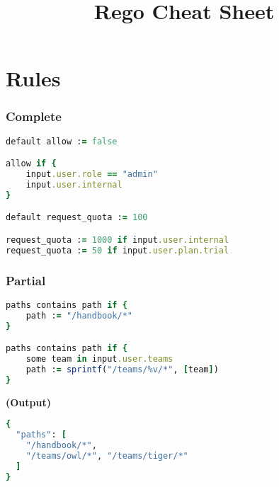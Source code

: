 \documentclass[twocolumn]{article}
\makeatletter
\renewcommand{\maketitle}{\bgroup\setlength{\parindent}{0pt}
\textbf{\LARGE{\@title}}
}
\makeatother
\begin{document}
\pagestyle{logo}
\title{Rego Cheat Sheet}

\maketitle
\vspace{-1em}





\section*{Rules}




\vspace{-1em}
\subsubsection*{Complete}

\begin{lstlisting}[language=Ruby]
default allow := false

allow if {
	input.user.role == "admin"
	input.user.internal
}

default request_quota := 100

request_quota := 1000 if input.user.internal
request_quota := 50 if input.user.plan.trial
\end{lstlisting}





\vspace{-1em}
\subsubsection*{Partial}

\begin{lstlisting}[language=Ruby]
paths contains path if {
	path := "/handbook/*"
}

paths contains path if {
	some team in input.user.teams
	path := sprintf("/teams/%v/*", [team])
}
\end{lstlisting}



\textbf{\tiny{(Output)}}
\begin{lstlisting}[language=Ruby]
{
  "paths": [
    "/handbook/*",
    "/teams/owl/*", "/teams/tiger/*"
  ]
}
\end{lstlisting}
\end{document}
